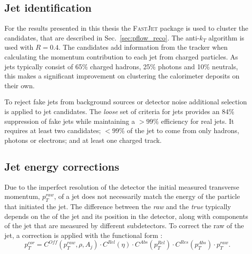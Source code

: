 \subsection{Jet identification}

For the results presented in this thesis the \textsc{FastJet}
\cite{Cacciari2012} package is used to cluster the \PF candidates,
that are described in Sec.~\ref{sec:pflow_reco}. The
anti-$k_T$ algorithm is used with $R=0.4$. The \PF candidates
add information from the tracker when
calculating the momentum contribution to each jet from charged
particles. As jets typically consist of 65\% charged hadrons, 25\%
photons and 10\% neutrals, this makes a significant improvement on
clustering the calorimeter deposits on their own. 

To reject fake jets from background sources or detector noise
additional selection is applied to jet candidates. The \emph{loose} set of
criteria for jets provides an 84\% suppression of fake jets while
maintaining a $>99\%$ efficiency for real jets. It requires at least
two \PF candidates; $<99\%$ of the jet to come from only hadrons,
photons or electrons; and at least one charged track.

\subsection{Jet energy corrections}
\label{sec:reco_jec}

Due to the imperfect resolution of the \CMS detector the initial
measured transverse momentum, $p_T^{raw}$, of a jet does not
necessarily match the energy of the particle that initiated the jet.
The difference between the \emph{raw} \pT and the \emph{true} \pT typically
depends on the \pT of the jet and its position in the detector, along
with components of the jet that are measured by different
subdetectors. To correct the raw \pT of the jet, a correction is
applied with the functional form
\cite{1748-0221-6-11-P11002}:
\begin{equation}
p_T^{cor}=C^{Off}(p_T^{raw},\rho,A_j)\cdot C^{Rel}(\eta)\cdot
C^{Abs}(p_T^{Rel})\cdot C^{Res}(p_T^{Abs})\cdot p_T^{raw}.
\end{equation}

